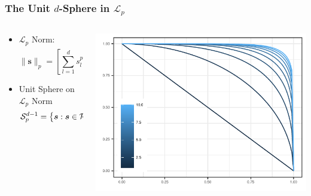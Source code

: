 \documentclass[aspectratio=169]{beamer}
\begin{document}
\begin{frame}
  \frametitle{The Unit $d$-Sphere in $\mathcal{L}_p$}
  \begin{columns}
    \begin{column}{.38\textwidth}
      \begin{itemize}
        \item $\mathcal{L}_p$ Norm:
          \begin{equation*}
            \lVert \bm{s}\rVert_p = \left[\sum_{l = 1}^ds_l^p\right]^{\frac{1}{p}}
          \end{equation*}
        \pause
        \item Unit Sphere on $\mathcal{L}_p$ Norm
          \begin{equation*}
            \mathcal{S}_{p}^{d-1} = \left\lbrace \bm{s} : 
                \bm{s}\in\mathcal{R}_+^d,\hspace{.2cm} \lVert\bm{s}\rVert_p = 1 \right\rbrace
          \end{equation*}
      \end{itemize}%
      \vfill
      ~
    \end{column}%
    \hfill%
    \begin{column}{.58\textwidth}
      \begin{center}
        \includegraphics[width = .8\linewidth, height = .8\linewidth]{./images/p_sphere}
      \end{center}
    \end{column}%
  \end{columns}%
\end{frame} %
\end{document}
